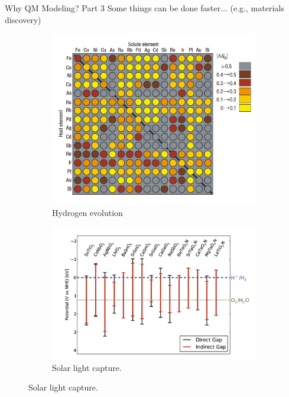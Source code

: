 \documentclass[aspectratio=169]{beamer}
\begin{document}
\begin{frame}{Why QM Modeling? Part 3}
Some things can be done faster... (e.g., materials discovery)
\begin{figure}
    \centering
    \begin{subfigure}{0.23\linewidth}
    \includegraphics[width=\linewidth]{lectures/figures/0.5_HER.png}
    \caption{Hydrogen evolution\cite{greeleyComputationalHighthroughputScreening2006}} 
    \end{subfigure}
    \begin{subfigure}{0.23\linewidth}
    \includegraphics[width=\linewidth]{lectures/figures/0.5_Solar.png}
    \caption{Solar light capture\cite{castelliComputationalScreeningPerovskite2012}.}
    \end{subfigure}

\end{figure}
\end{frame}
\end{document}
